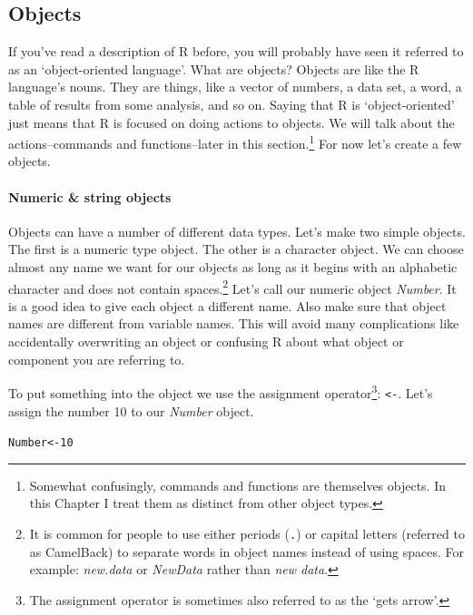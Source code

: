 \subsection{Objects}\label{Objects}

If you've read a description of R before, you will probably have seen it referred to as an `object-oriented language'.  What are objects? Objects are like the R language's nouns. They are things, like a vector of numbers, a data set, a word, a table of results from some analysis, and so on. Saying that R is `object-oriented' just means that R is focused on doing actions to objects. We will talk about the actions--commands and functions--later in this section.\footnote{Somewhat confusingly, commands and functions are themselves objects. In this Chapter I treat them as distinct from other object types.} For now let's create a few objects.

\paragraph{Numeric \& string objects}

Objects can have a number of different data types. Let's make two simple objects. The first is a numeric type object. The other is a character object. We can choose almost any name\label{ObjectNames} we want for our objects as long as it begins with an alphabetic character and does not contain spaces.\footnote{It is common for people to use either periods (\texttt{.}) or capital letters (referred to as CamelBack) to separate words in object names instead of using spaces. For example: {\emph{new.data}} or {\emph{NewData}} rather than {\emph{new data}}.} Let's call our numeric object {\emph{Number}}. It is a good idea to give each object a different name. Also make sure that object names are different from variable names. This will avoid many complications like accidentally overwriting an object or confusing R about what object or component you are referring to.

To put something into the object we use the assignment operator\footnote{The assignment operator is sometimes also referred to as the `gets arrow'.}: {\tt{\textless -}}. Let's assign the number 10 to our {\emph{Number}} object.

\begin{knitrout}
\color{fgcolor}\begin{kframe}
\begin{alltt}
Number <- 10
\end{alltt}
\end{kframe}
\end{knitrout}


